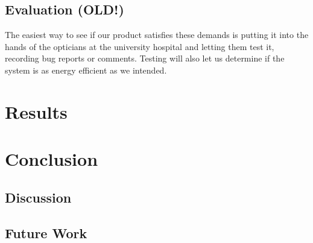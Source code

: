 \documentclass[12pt,a4paper,notitlepage]{report}
\begin{document}
\section{Evaluation (OLD!)} %
The easiest way to see if our product satisfies these demands is putting it into the hands of the opticians at the university hospital and letting them test it, recording bug reports or comments. Testing will also let us determine if the system is as energy efficient as we intended.

\chapter{Results}

\chapter{Conclusion}

\section{Discussion}

\section{Future Work}

{}

\end{document}
